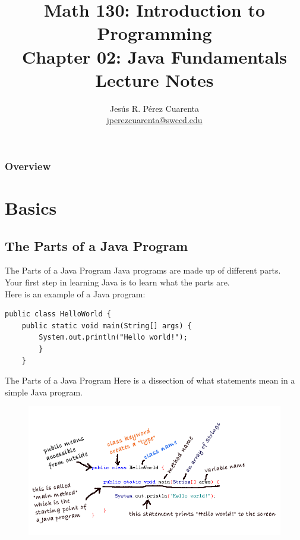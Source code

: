 \documentclass[11pt]{beamer}
\title[Chapter 02 Notes]{Math 130: Introduction to Programming \\ Chapter 02: Java Fundamentals \\ Lecture Notes}
\author{
    Jesús R. Pérez Cuarenta \\
    \href{mailto:jperezcuarenta@swccd.edu}{jperezcuarenta@swccd.edu}
    }
\date{}
\begin{document}
  \section{}
  \begin{frame}
    \maketitle
  \end{frame}

  \begin{frame}
  \frametitle{Overview}
      \tableofcontents
  \end{frame}

\section{Basics}
\subsection{The Parts of a Java Program}
\begin{frame}[fragile]{The Parts of a Java Program}
    Java programs are made up of different parts. \\ \vspace{1em}
    Your first step in learning Java is to learn what the parts are. \\ \vspace{1em}
    Here is an example of a Java program:
    \begin{lstlisting}
public class HelloWorld {
    public static void main(String[] args) {
        System.out.println("Hello world!");
        }
    }
    \end{lstlisting}
\end{frame}

\begin{frame}[fragile]{The Parts of a Java Program}
    Here is a dissection of what statements mean in a simple Java program.
    \noindent
    \begin{figure}[H]
    \centering
    \includegraphics[scale=0.5]{Images/chapter02_section01_01.png}
    \end{figure}
\end{frame}
\end{document}
